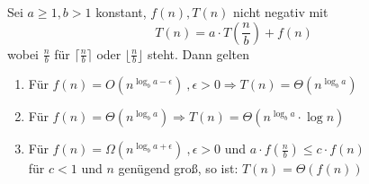 \begin{satz}
Sei $a \geq 1, b > 1$ konstant, $f(n) , T(n)$ nicht negativ mit 
$$
T(n) = a \cdot T \left(\frac{n}{b}\right) + f(n)
$$
wobei $\frac{n}{b}$ für $\lceil \frac{n}{b} \rceil$ oder $\lfloor \frac{n}{b} \rfloor$ steht. Dann gelten
\begin{enumerate}[1.]
\item Für $f(n) = O\left(n^{\log_b a - \epsilon}\right)\ , \epsilon > 0 \Rightarrow T(n) = \Theta(n^{\log_b a})$ 
\item Für $f(n) = \Theta \left(n^{\log_b a}\right) \Rightarrow T(n) = \Theta (n^{\log_b a} \cdot \log n)$ 
\item Für $f(n) = \Omega \left(n^{\log_b a + \epsilon}\right)\ , \epsilon > 0$ und $a \cdot f(\frac{n}{b}) \leq c \cdot f(n)$\\
für $c < 1$ und $n$ genügend groß, so ist: $T(n) = \Theta(f(n))$
\end{enumerate}
\end{satz}

